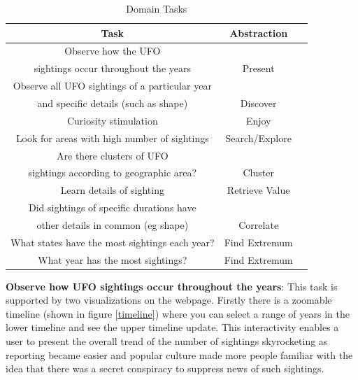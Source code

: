 \documentclass[journal]{vgtc}                %
\begin{document}
\begin{table}[h]
\caption{Domain Tasks} %
\centering %
\begin{tabular}{c c c} %
\hline\hline %
 Task & Abstraction\\ [0.5ex]
\hline %

Observe how the UFO \\sightings occur throughout the years & Present\\[1ex] %

Observe all UFO sightings of a particular year \\ and specific details (such as shape) & Discover\\[1ex] %

Curiosity stimulation & Enjoy\\[1ex] %

Look for areas with high number of sightings & Search/Explore\\[1ex] %

Are there clusters of UFO\\ sightings according to geographic area? & Cluster\\[1ex] %

Learn details of sighting & Retrieve Value\\[1ex] %

Did sightings of specific durations have \\ other details in common (eg shape) & Correlate \\[1ex] %

What states have the most sightings each year? & Find Extremum\\[1ex] %

What year has the most sightings? & Find Extremum\\[1ex] %


\hline 
\end{tabular}
\label{tab:PPer}
\end{table}

\textbf{Observe how UFO sightings occur throughout the years}: This task is supported by two visualizations on the webpage. Firstly there is a zoomable timeline (shown in figure \ref{timeline}) where you can select a range of years in the lower timeline and see the upper timeline update. This interactivity enables a user to present the overall trend of the number of sightings skyrocketing as reporting became easier and popular culture made more people familiar with the idea that there was a secret conspiracy to suppress news of such sightings.
\end{document}
